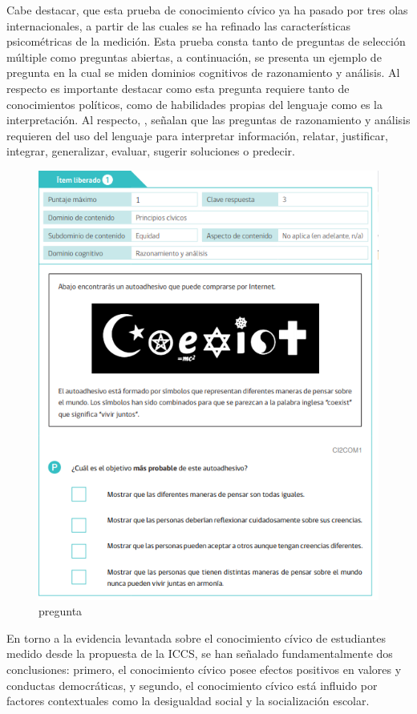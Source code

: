 \documentclass[12pt,twoside]{templates/facsothesis}
\begin{document}
Cabe destacar, que esta prueba de conocimiento cívico ya ha pasado por tres olas internacionales, a partir de las cuales se ha refinado las características psicométricas de la medición. Esta prueba consta tanto de preguntas de selección múltiple como preguntas abiertas, a continuación, se presenta un ejemplo de pregunta en la cual se miden dominios cognitivos de razonamiento y análisis. Al respecto es importante destacar como esta pregunta requiere tanto de conocimientos políticos, como de habilidades propias del lenguaje como es la interpretación. Al respecto, \citet{schulz_Estudio_2011}, señalan que las preguntas de razonamiento y análisis requieren del uso del lenguaje para interpretar información, relatar, justificar, integrar, generalizar, evaluar, sugerir soluciones o predecir.

\begin{figure}[!ht]

{\centering \includegraphics[width=0.8\linewidth,]{images/Pregunta-liberada1} 

}

\caption{pregunta}\label{fig:unnamed-chunk-3}
\end{figure}

En torno a la evidencia levantada sobre el conocimiento cívico de estudiantes medido desde la propuesta de la ICCS, se han señalado fundamentalmente dos conclusiones: primero, el conocimiento cívico posee efectos positivos en valores y conductas democráticas, y segundo, el conocimiento cívico está influido por factores contextuales como la desigualdad social y la socialización escolar.
\end{document}
